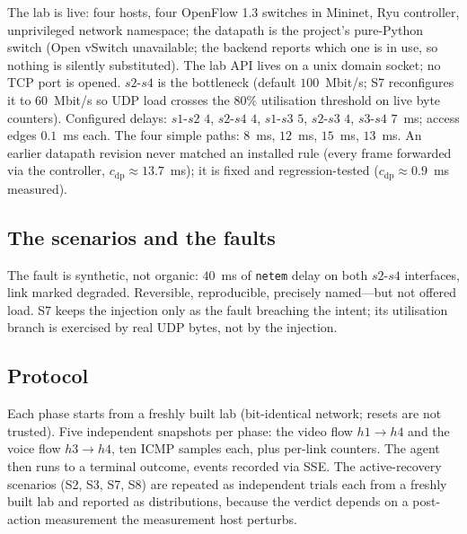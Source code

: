\documentclass[conference]{IEEEtran}
\begin{document}
The lab is live: four hosts, four OpenFlow 1.3 switches in Mininet,
Ryu controller, unprivileged network namespace; the datapath is the project's
pure-Python switch (Open vSwitch unavailable; the backend reports which one
is in use, so nothing is silently substituted). The lab API lives on a unix
domain socket; no TCP port is opened. $s2$-$s4$ is the bottleneck (default
$100$~Mbit/s; S7 reconfigures it to $60$~Mbit/s so UDP load crosses the
$80\%$ utilisation threshold on live byte counters). Configured delays:
$s1$-$s2$ $4$, $s2$-$s4$ $4$, $s1$-$s3$ $5$, $s2$-$s3$ $4$, $s3$-$s4$
$7$~ms; access edges $0.1$~ms each. The four simple paths: $8$~ms,
$12$~ms, $15$~ms, $13$~ms. An earlier datapath revision never matched an
installed rule (every frame forwarded via the controller, $c_{\mathrm{dp}}
\approx 13.7$~ms); it is fixed and regression-tested ($c_{\mathrm{dp}}
\approx 0.9$~ms measured).

\subsection{The scenarios and the faults}

The fault is synthetic, not organic: $40$~ms of \texttt{netem} delay on
both $s2$-$s4$ interfaces, link marked degraded. Reversible, reproducible,
precisely named---but not offered load. S7 keeps the injection only as the
fault breaching the intent; its utilisation branch is exercised by real UDP
bytes, not by the injection.

\subsection{Protocol}

Each phase starts from a freshly built lab (bit-identical network; resets
are not trusted). Five independent snapshots per phase: the video flow
$h1\!\to\!h4$ and the voice flow $h3\!\to\!h4$, ten ICMP samples each,
plus per-link counters. The agent then runs to a terminal outcome, events
recorded via SSE. The active-recovery scenarios (S2, S3, S7, S8) are
repeated as \RecoveryTrials{} independent trials each from a freshly built
lab and reported as distributions, because the verdict depends on a
post-action measurement the measurement host perturbs.
\end{document}
